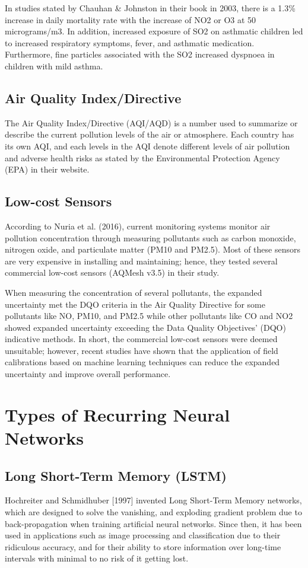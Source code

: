 \documentclass[10pt,11pt,12pt,oneside]{book}
\begin{document}
        In studies stated by Chauhan \& Johnston in their book in 2003, there is a 1.3\% increase in daily mortality rate with the increase of NO2 or O3 at 50 micrograms/m3. In addition, increased exposure of SO2 on asthmatic children led to increased respiratory symptoms, fever, and asthmatic medication. Furthermore, fine particles associated with the SO2 increased dyspnoea in children with mild asthma. \cite{doi:10.1093/bmb/ldg022}
        \subsection{Air Quality Index/Directive}
        The Air Quality Index/Directive (AQI/AQD) is a number used to summarize or describe the current pollution levels of the air or atmosphere. Each country has its own AQI, and each levels in the AQI denote different levels of air pollution and adverse health risks as stated by the Environmental Protection Agency (EPA) in their website. \cite{airbasics}
        \subsection{Low-cost Sensors}
        According to Nuria et al.
 (2016), current monitoring systems monitor air pollution concentration through measuring pollutants such as carbon monoxide, nitrogen oxide, and particulate matter (PM10 and PM2.5). Most of these sensors are very expensive in installing and maintaining; hence, they tested several commercial low-cost sensors (AQMesh v3.5) in their study.

        When measuring the concentration of several pollutants, the expanded uncertainty met the DQO criteria in the Air Quality Directive for some pollutants like NO, PM10, and PM2.5 while other pollutants like CO and NO2 showed expanded uncertainty exceeding the Data Quality Objectives’ (DQO) indicative methods. In short, the commercial low-cost sensors were deemed unsuitable; however, recent studies have shown that the application of field calibrations based on machine learning techniques can reduce the expanded uncertainty and improve overall performance. \cite{Castell2017}
    \section{Types of Recurring Neural Networks}
        \subsection{Long Short-Term Memory (LSTM)}
        Hochreiter and Schmidhuber [1997] invented Long Short-Term Memory networks, which are designed to solve the vanishing, and exploding gradient problem due to back-propagation when training artificial neural networks. Since then, it has been used in applications such as image processing and classification due to their ridiculous accuracy, and for their ability to store information over long-time intervals with minimal to no risk of it getting lost. \cite{Hochreiter:1997:LSM:1246443.1246450}
\end{document}
